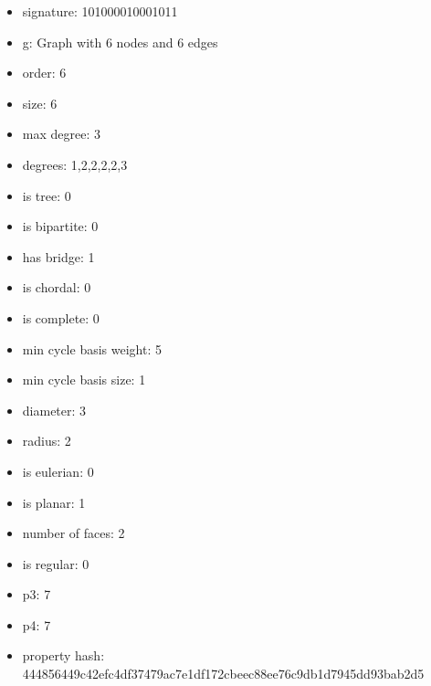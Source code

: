 \begin{itemize}
\item signature: 101000010001011
\item g: Graph with 6 nodes and 6 edges
\item order: 6
\item size: 6
\item max degree: 3
\item degrees: 1,2,2,2,2,3
\item is tree: 0
\item is bipartite: 0
\item has bridge: 1
\item is chordal: 0
\item is complete: 0
\item min cycle basis weight: 5
\item min cycle basis size: 1
\item diameter: 3
\item radius: 2
\item is eulerian: 0
\item is planar: 1
\item number of faces: 2
\item is regular: 0
\item p3: 7
\item p4: 7
\item property hash: 444856449c42efc4df37479ac7e1df172cbeec88ee76c9db1d7945dd93bab2d5
\end{itemize}
\newpage
\begin{figure}
\end{figure}
